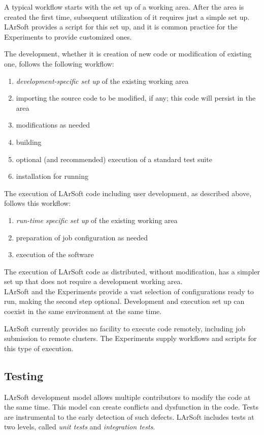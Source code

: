 A typical workflow starts with the set up of a working area.
After the area is created the first time, subsequent utilization of it requires just a simple set up.
LArSoft provides a script for this set up,
and it is common practice for the Experiments to provide customized ones.

The development, whether it is creation of new code or modification of existing one,
follows the following workflow:
\begin{enumerate}
   \item \emph{development-specific set up} of the existing working area
   \item importing the source code to be modified, if any; this code will persist in the area
   \item modifications as needed
   \item building
   \item optional (and recommended) execution of a standard test suite
   \item installation for running
\end{enumerate}

The execution of LArSoft code including user development, as described above,
follows this workflow:
\begin{enumerate}
   \item \emph{run-time specific set up} of the existing working area
   \item preparation of job configuration as needed
   \item execution of the software
\end{enumerate}
The execution of LArSoft code as distributed, without modification,
has a simpler set up that does not require a development working area.\\
LArSoft and the Experiments provide a vast selection of configurations ready to run, making the second step optional.
Development and execution set up can coexist in the same environment at the same time.

LArSoft currently provides no facility to execute code remotely,
including job submission to remote clusters.
The Experiments supply workflows and scripts for this type of execution.



\subsection{Testing}
\label{ssec:Development:testing}

LArSoft development model allows multiple contributors to modify the
code at the same time. This model can create conflicts and dysfunction
in the code. Tests are instrumental to the early detection of such
defects. LArSoft includes tests at two levels, called \emph{unit tests}
and \emph{integration tests}.

